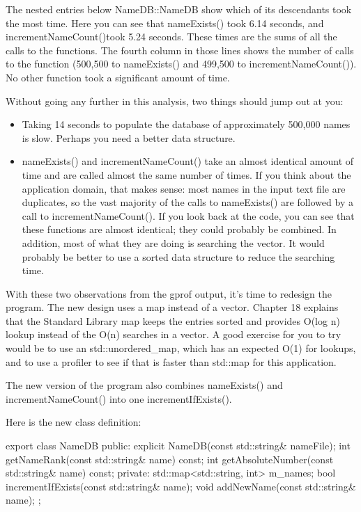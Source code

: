 The nested entries below NameDB::NameDB show which of its descendants took the most time. Here you can see that nameExists() took 6.14 seconds, and incrementNameCount()took 5.24 seconds. These times are the sums of all the calls to the functions. The fourth column in those lines shows the number of calls to the function (500,500 to nameExists() and 499,500 to incrementNameCount()). No other function took a significant amount of time.

Without going any further in this analysis, two things should jump out at you:

\begin{itemize}
\item
Taking 14 seconds to populate the database of approximately 500,000 names is slow. Perhaps you need a better data structure.

\item
nameExists() and incrementNameCount() take an almost identical amount of time and are called almost the same number of times. If you think about the application domain, that makes sense: most names in the input text file are duplicates, so the vast majority of the calls to nameExists() are followed by a call to incrementNameCount(). If you look back at the code, you can see that these functions are almost identical; they could probably be combined. In addition, most of what they are doing is searching the vector. It would probably be better to use a sorted data structure to reduce the searching time.
\end{itemize}


With these two observations from the gprof output, it’s time to redesign the program. The new design uses a map instead of a vector. Chapter 18 explains that the Standard Library map keeps the entries sorted and provides O(log n) lookup instead of the O(n) searches in a vector. A good exercise for you to try would be to use an std::unordered\_map, which has an expected O(1) for lookups, and to use a profiler to see if that is faster than std::map for this application.

The new version of the program also combines nameExists() and incrementNameCount() into one incrementIfExists().

Here is the new class definition:

\begin{cpp}
export class NameDB
{
    public:
        explicit NameDB(const std::string& nameFile);
        int getNameRank(const std::string& name) const;
        int getAbsoluteNumber(const std::string& name) const;
    private:
        std::map<std::string, int> m_names;
        bool incrementIfExists(const std::string& name);
        void addNewName(const std::string& name);
};
\end{cpp}

